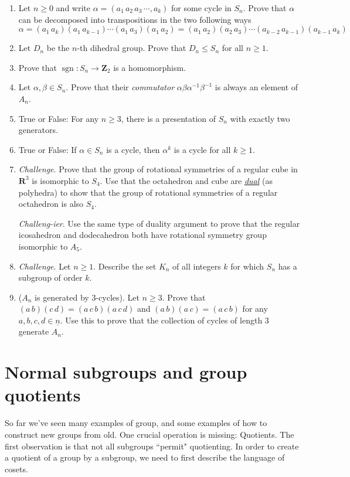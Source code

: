 \documentclass[12pt]{article}
\numberwithin{equation}{subsection}
\theoremstyle{note}
\begin{document}
\begin{enumerate}[label=\arabic*.]
	\item \label{permutation-ex} Let $n\geq 0$ and write $\alpha=(a_1\,a_2\,a_3\,\cdots,a_k)$ for some cycle in $S_n$. Prove that $\alpha$ can be decomposed into transpositions in the two following ways
	\[ \alpha=(a_1\,a_k)(a_1 \, a_{k-1})\cdots (a_1\,a_3)(a_1\,a_2)=(a_1\,a_2)(a_2\,a_3)\cdots(a_{k-2}\,a_{k-1})(a_{k-1}\,a_k)\]
	\item Let $D_n$ be the $n$-th dihedral group. Prove that $D_n\leq S_n$ for all $n\geq 1$. 
	\item \label{sgn-hom}Prove that $\operatorname{sgn}\colon S_n\to\mathbf{Z}_2$ is a homomorphism. 
	\item Let $\alpha,\beta \in S_n$. Prove that their \textit{commutator} $\alpha\beta\alpha^{-1}\beta^{-1}$ is always an element of $A_n$.
	\item True or False: For any $n\geq 3$, there is a presentation of $S_n$ with exactly two generators. 
	\item True or False: If $\alpha\in S_n$ is a cycle, then $\alpha^k$ is a cycle for all $k\geq 1$.

	\item \textit{Challenge}. Prove that the group of rotational symmetries of a regular cube in $\mathbf{R}^3$ is isomorphic to $S_4$. Use that the octahedron and cube are \href{https://en.wikipedia.org/wiki/Dual_polyhedron}{\textit{dual}} (as polyhedra) to show that the group of rotational symmetries of a regular octahedron is also $S_4$. 
	
	\textit{Challeng-ier}. Use the same type of duality argument to prove that the regular icosahedron and dodecahedron both have rotational symmetry group isomorphic to $A_5$.
	\item \textit{Challenge}. Let $n\geq 1$. Describe the set $K_n$ of all integers $k$ for which $S_n$ has a subgroup of order $k$.
	\item ($A_n$ is generated by $3$-cycles). Let $n\geq 3$. Prove that $(a\,b)(c\,d)=(a\,c\,b)(a\,c\,d)$ and $(a\,b)(a\,c)=(a\,c\,b)$ for any $a,b,c,d\in \underline{n}$. Use this to prove that the collection of cycles of length $3$ generate $A_n$. 
\end{enumerate}

\section{Normal subgroups and group quotients}

So far we've seen many examples of group, and some examples of how to construct new groups from old. One crucial operation is missing: Quotients. The first observation is that not all subgroups ``permit" quotienting. In order to create a quotient of a group by a subgroup, we need to first describe the language of cosets.
\end{document}
